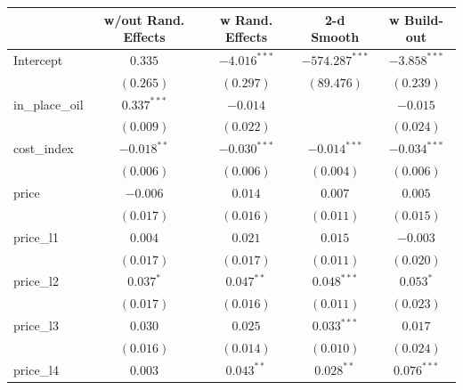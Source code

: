 \documentclass[12pt]{article}
\begin{document}
\begin{table}
\scriptsize
\begin{center}
\begin{tabular}{l c c c c }
\hline
 & w/out Rand. Effects & w Rand. Effects & 2-d Smooth & w Build-out \\
\hline
Intercept                                  & $0.335$        & $-4.016^{***}$ & $-574.287^{***}$ & $-3.858^{***}$ \\
                                             & $(0.265)$      & $(0.297)$      & $(89.476)$       & $(0.239)$      \\
in\_place\_oil             & $0.337^{***}$  & $-0.014$       &                  & $-0.015$       \\
                                             & $(0.009)$      & $(0.022)$      &                  & $(0.024)$      \\
cost\_index                            & $-0.018^{**}$  & $-0.030^{***}$ & $-0.014^{***}$   & $-0.034^{***}$ \\
                                             & $(0.006)$      & $(0.006)$      & $(0.004)$        & $(0.006)$      \\
price                                  & $-0.006$       & $0.014$        & $0.007$          & $0.005$        \\
                                             & $(0.017)$      & $(0.016)$      & $(0.011)$        & $(0.015)$      \\
price\_l1                              & $0.004$        & $0.021$        & $0.015$          & $-0.003$       \\
                                             & $(0.017)$      & $(0.017)$      & $(0.011)$        & $(0.020)$      \\
price\_l2                              & $0.037^{*}$    & $0.047^{**}$   & $0.048^{***}$    & $0.053^{*}$    \\
                                             & $(0.017)$      & $(0.016)$      & $(0.011)$        & $(0.023)$      \\
price\_l3                              & $0.030$        & $0.025$        & $0.033^{***}$    & $0.017$        \\
                                             & $(0.016)$      & $(0.014)$      & $(0.010)$        & $(0.024)$      \\
price\_l4                              & $0.003$        & $0.043^{**}$   & $0.028^{**}$     & $0.076^{***}$  \\

\end{tabular}
\end{center}
\end{table}
\end{document}
